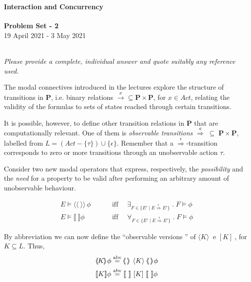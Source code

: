 \documentclass[titlepage,12pt]{article}
\def\rtrano#1{\stackrel{#1}{\Longrightarrow}}
\def\tran#1{\stackrel{#1}{\longrightarrow}}
\def\PP{\mathbf{P}}
\def\abv{\stackrel{\rm abv}{=}}
\def\universal#1#2{\forall_{#1}\;.\; #2}
\def\existential#1#2{\exists_{#1}\;.\; #2}
\def\pv#1#2{\langle #1 \rangle #2}
\def\nc#1#2{[#1]#2}
\def\pvo#1#2{\langle \! \! \! \langle #1 \rangle \! \! \! \rangle\, #2}
\def\nco#1#2{\llbracket #1 \rrbracket #2}
\def\setdef#1#2{\{#1\; |\;#2\}}             %
\def\enset#1{\mathopen{ \{ }#1\mathclose{ \} }} %
\begin{document}
\hline
\begin{center}
\textbf{Interaction and Concurrency}~\\ ~\\
\textbf{Problem Set - 2 } \\
19 April 2021 - 3 May 2021\\
~\\
\end{center}


\hline

\vspace{1.5cm}

\emph{ Please provide a complete, individual answer and quote suitably any reference used.}
\vspace{1cm}

The modal connectives  introduced in the lectures explore the structure of
transitions in $ \PP $, i.e. binary relations $\tran{x} \subseteq \PP \times \PP$, for $ x \in Act$,
 relating the validity of the formulas to sets of
states reached through certain transitions.

It is possible, however,  to define other transition relations in $\PP$
that are computationally relevant.
One of them is \emph {observable transitions} 
$ \rtrano{a} \; \subseteq \; \PP \times \PP $, labelled from  $ L = (Act - \enset{\tau})  \cup \enset{\epsilon}$.
Remember that a $ \rtrano{\epsilon}$-transition corresponds to zero or more transitions through an
unobservable action  $\tau$.

Consider two new modal operators
that express, respectively, the \emph{possibility}
and the \emph{need} for a property to be valid
after performing an arbitrary amount of unobservable behaviour.

\begin{align*}
E  \models \pvo{~}{\phi} & \text{~~~~~~ iff ~~~}
\existential{F \in \setdef{E'}{E \rtrano{\epsilon} E'}}{F \models \phi} \\
E  \models \nco{~}{\phi} & \text{~~~~~~ iff ~~~}
\universal{F \in \setdef{E'}{E \rtrano{\epsilon} E'}}{F \models \phi} 
\end{align*}

By abbreviation we can now define the ``observable versions '' of
$\pv{K}{~}$ e $\nc{K}{~}$, for $K \subseteq L$.  Thus,
\begin{align*}
\pvo{K}{\phi} \abv\; &  \pvo{~}{~} \pv{K}{~}\pvo{~}{\phi} \\
\nco{K}{\phi} \abv\; &  \nco{~}{~} \nc{K}{~}\nco{~}{\phi} 
\end{align*}
\end{document}
